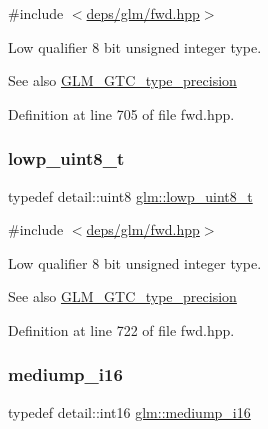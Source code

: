 {\ttfamily \#include $<$\hyperlink{fwd_8hpp}{deps/glm/fwd.\+hpp}$>$}

Low qualifier 8 bit unsigned integer type. \begin{DoxySeeAlso}{See also}
\hyperlink{group__gtc__type__precision}{G\+L\+M\+\_\+\+G\+T\+C\+\_\+type\+\_\+precision} 
\end{DoxySeeAlso}


Definition at line 705 of file fwd.\+hpp.

\mbox{\label{group__gtc__type__precision_ga0910ef24195d1b8b26e34d73148c0c45}} 
\subsubsection{\texorpdfstring{lowp\+\_\+uint8\+\_\+t}{lowp\_uint8\_t}}
{\footnotesize\ttfamily typedef detail\+::uint8 \hyperlink{group__gtc__type__precision_ga0910ef24195d1b8b26e34d73148c0c45}{glm\+::lowp\+\_\+uint8\+\_\+t}}



{\ttfamily \#include $<$\hyperlink{fwd_8hpp}{deps/glm/fwd.\+hpp}$>$}

Low qualifier 8 bit unsigned integer type. \begin{DoxySeeAlso}{See also}
\hyperlink{group__gtc__type__precision}{G\+L\+M\+\_\+\+G\+T\+C\+\_\+type\+\_\+precision} 
\end{DoxySeeAlso}


Definition at line 722 of file fwd.\+hpp.

\mbox{\label{group__gtc__type__precision_ga8454fc6a82c7bb787d0ac9663e08f63d}} 
\subsubsection{\texorpdfstring{mediump\+\_\+i16}{mediump\_i16}}
{\footnotesize\ttfamily typedef detail\+::int16 \hyperlink{group__gtc__type__precision_ga8454fc6a82c7bb787d0ac9663e08f63d}{glm\+::mediump\+\_\+i16}}



